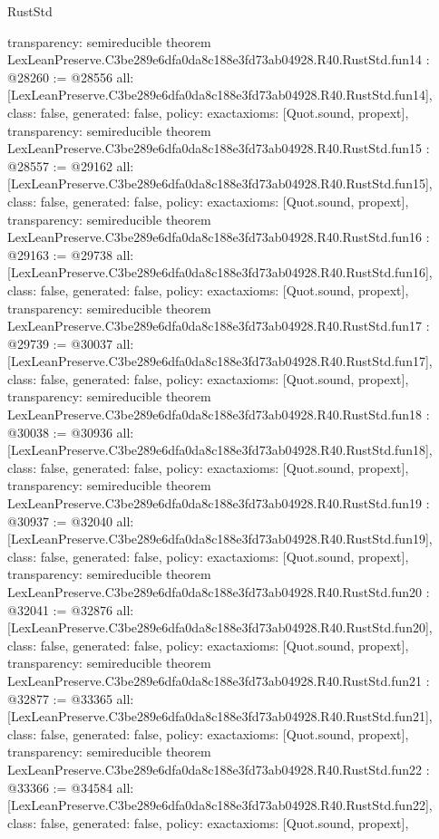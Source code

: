 \begin{lexlean}{RustStd}
\begin{coremodule}
{  transparency: semireducible
}
theorem LexLeanPreserve.C3be289e6dfa0da8c188e3fd73ab04928.R40.RustStd.fun14 : @28260 := @28556 {
  all: [LexLeanPreserve.C3be289e6dfa0da8c188e3fd73ab04928.R40.RustStd.fun14],
  class: false,
  generated: false,
  policy: exact{axioms: [Quot.sound, propext]},
  transparency: semireducible
}
theorem LexLeanPreserve.C3be289e6dfa0da8c188e3fd73ab04928.R40.RustStd.fun15 : @28557 := @29162 {
  all: [LexLeanPreserve.C3be289e6dfa0da8c188e3fd73ab04928.R40.RustStd.fun15],
  class: false,
  generated: false,
  policy: exact{axioms: [Quot.sound, propext]},
  transparency: semireducible
}
theorem LexLeanPreserve.C3be289e6dfa0da8c188e3fd73ab04928.R40.RustStd.fun16 : @29163 := @29738 {
  all: [LexLeanPreserve.C3be289e6dfa0da8c188e3fd73ab04928.R40.RustStd.fun16],
  class: false,
  generated: false,
  policy: exact{axioms: [Quot.sound, propext]},
  transparency: semireducible
}
theorem LexLeanPreserve.C3be289e6dfa0da8c188e3fd73ab04928.R40.RustStd.fun17 : @29739 := @30037 {
  all: [LexLeanPreserve.C3be289e6dfa0da8c188e3fd73ab04928.R40.RustStd.fun17],
  class: false,
  generated: false,
  policy: exact{axioms: [Quot.sound, propext]},
  transparency: semireducible
}
theorem LexLeanPreserve.C3be289e6dfa0da8c188e3fd73ab04928.R40.RustStd.fun18 : @30038 := @30936 {
  all: [LexLeanPreserve.C3be289e6dfa0da8c188e3fd73ab04928.R40.RustStd.fun18],
  class: false,
  generated: false,
  policy: exact{axioms: [Quot.sound, propext]},
  transparency: semireducible
}
theorem LexLeanPreserve.C3be289e6dfa0da8c188e3fd73ab04928.R40.RustStd.fun19 : @30937 := @32040 {
  all: [LexLeanPreserve.C3be289e6dfa0da8c188e3fd73ab04928.R40.RustStd.fun19],
  class: false,
  generated: false,
  policy: exact{axioms: [Quot.sound, propext]},
  transparency: semireducible
}
theorem LexLeanPreserve.C3be289e6dfa0da8c188e3fd73ab04928.R40.RustStd.fun20 : @32041 := @32876 {
  all: [LexLeanPreserve.C3be289e6dfa0da8c188e3fd73ab04928.R40.RustStd.fun20],
  class: false,
  generated: false,
  policy: exact{axioms: [Quot.sound, propext]},
  transparency: semireducible
}
theorem LexLeanPreserve.C3be289e6dfa0da8c188e3fd73ab04928.R40.RustStd.fun21 : @32877 := @33365 {
  all: [LexLeanPreserve.C3be289e6dfa0da8c188e3fd73ab04928.R40.RustStd.fun21],
  class: false,
  generated: false,
  policy: exact{axioms: [Quot.sound, propext]},
  transparency: semireducible
}
theorem LexLeanPreserve.C3be289e6dfa0da8c188e3fd73ab04928.R40.RustStd.fun22 : @33366 := @34584 {
  all: [LexLeanPreserve.C3be289e6dfa0da8c188e3fd73ab04928.R40.RustStd.fun22],
  class: false,
  generated: false,
  policy: exact{axioms: [Quot.sound, propext]},
}
\end{coremodule}
\end{lexlean}
